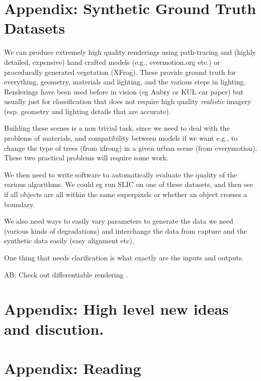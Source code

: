 \documentclass{article}
\begin{document}
\section{Appendix: Synthetic Ground Truth Datasets}
We can produce extremely high quality renderings using path-tracing and (highly detailed, expensive) 
hand crafted models (e.g., evermotion.org etc.) or procedurally generated vegetation (XFrog). These provide ground truth for everything, geometry, materials and lighting, and the various steps in lighting. Renderings have been used before in vision (eg Aubry \cite{aubry2014painting} or KUL car paper\cite{rematas2014image}) but usually just for classification that does not require high quality \emph{realistic} imagery (esp. geometry and lighting details that are accurate).

Building these scenes is a non trivial task, since we need to deal with the problems of materials, and compatibility between models if we want e.g., to change the type of trees (from xfrong) in a given urban scene 
(from everymotion). These two practical problems will require some work.

We then need to write software to automatically evaluate the quality of the various algorithms.
We could eg run SLIC on one of these datasets, and then see if all objects are all within the same
superpixels or whether an object crosses a boundary.

We also need ways to easily vary parameters to generate the data we need (various kinds of
degradations) and interchange the data from capture and the synthetic data easily
(easy alignment etc).

One thing that needs clarification is what exactly are the inputs and outputs.

AB: Check out differentiable rendering \cite{loper2014opendr}.

\section{Appendix: High level new ideas and discution. }

\section{Appendix: Reading}


\subsection{ \cite{bodis2015superpixel} }
\end{document}
